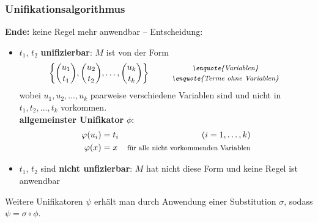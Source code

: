 \documentclass{beamer}
\begin{document}
\begin{frame} \frametitle{Unifikationsalgorithmus}
	\footnotesize
	\textbf{Ende:} keine Regel mehr anwendbar -- Entscheidung:
	\begin{itemize}
		\item $t_1$, $t_2$ \textbf{unifizierbar}: $M$ ist von der Form
		\begin{equation*}
			\menge{\binom{u_1}{t_1}, \binom{u_2}{t_2}, \dots, \binom{u_k}{t_k}} \qquad 
			\begin{array}{c} 
				\footnotesize \text{\textit{\enquote{Variablen}}} \\ 
				\footnotesize \text{\textit{\enquote{Terme ohne Variablen}}}
			\end{array}
		\end{equation*}
		wobei $u_1, u_2, \dots, u_k$ paarweise verschiedene Variablen sind und nicht in $t_1, t_2, \dots, t_k$ vorkommen.  \\
		\textbf{allgemeinster Unifikator} $\phi$: 
		\begin{equation*}
			\begin{aligned}
				\phi(u_i) &= t_i & (i = 1, \dots, k) \\
				\phi(x) &= x     & \footnotesize \text{für alle nicht vorkommenden Variablen}
			\end{aligned}
		\end{equation*}
		\item $t_1$, $t_2$ sind \textbf{nicht unfizierbar}: $M$ hat nicht diese Form und keine Regel ist anwendbar
	\end{itemize}
	
	Weitere Unifikatoren $\psi$ erhält man durch Anwendung einer Substitution $\sigma$, sodass $\psi = \sigma \circ \phi$.
\end{frame}
\end{document}
